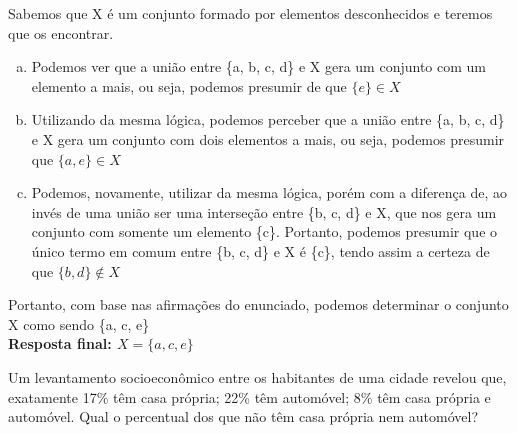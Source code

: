 \begin{solution}{}{}
    Sabemos que X é um conjunto formado por elementos desconhecidos e teremos que os encontrar.\\
    \begin{enumerate}[(a)]
        \item Podemos ver que a união entre \{a, b, c, d\} e X gera um conjunto com um elemento a mais, ou seja, podemos presumir de que $\{e\} \in X$
        \item Utilizando da mesma lógica, podemos perceber que a união entre \{a, b, c, d\} e X gera um conjunto com dois elementos a mais, ou seja, podemos presumir que $\{a, e\} \in X$
        \item Podemos, novamente, utilizar da mesma lógica, porém com a diferença de, ao invés de uma união ser uma interseção entre \{b, c, d\} e X, que nos gera um conjunto com somente um elemento \{c\}. Portanto, podemos presumir que o único termo em comum entre \{b, c, d\} e X é \{c\}, tendo assim a certeza de que $\{b, d\} \notin X$
    \end{enumerate}

    Portanto, com base nas afirmações do enunciado, podemos determinar o conjunto X como sendo \{a, c, e\}\\
    \textbf{Resposta final: $X=\{a, c, e\}$}
\end{solution}

\begin{problem}{}{}
    Um levantamento socioeconômico entre os habitantes de uma cidade revelou que, exatamente
    17\% têm casa própria; 22\% têm automóvel; 8\% têm casa própria e automóvel. Qual o percentual
    dos que não têm casa própria nem automóvel?
\end{problem}

